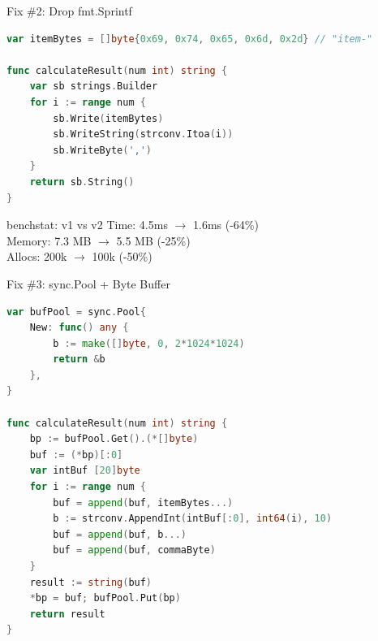\documentclass{beamer}
\begin{document}
\begin{frame}[fragile]{Fix \#2: Drop fmt.Sprintf}

  \begin{lstlisting}[language=Go]
var itemBytes = []byte{0x69, 0x74, 0x65, 0x6d, 0x2d} // "item-"

func calculateResult(num int) string {
    var sb strings.Builder
    for i := range num {
        sb.Write(itemBytes)
        sb.WriteString(strconv.Itoa(i))
        sb.WriteByte(',')
    }
    return sb.String()
}
  \end{lstlisting}

  \begin{block}{benchstat: v1 vs v2}
    Time: 4.5ms $\rightarrow$ 1.6ms (\alert{-64\%}) \\
    Memory: 7.3 MB $\rightarrow$ 5.5 MB (\alert{-25\%}) \\
    Allocs: 200k $\rightarrow$ 100k (\alert{-50\%})
  \end{block}

\end{frame}

\begin{frame}[fragile]{Fix \#3: sync.Pool + Byte Buffer}

  \begin{lstlisting}[language=Go]
var bufPool = sync.Pool{
    New: func() any {
        b := make([]byte, 0, 2*1024*1024)
        return &b
    },
}

func calculateResult(num int) string {
    bp := bufPool.Get().(*[]byte)
    buf := (*bp)[:0]
    var intBuf [20]byte
    for i := range num {
        buf = append(buf, itemBytes...)
        b := strconv.AppendInt(intBuf[:0], int64(i), 10)
        buf = append(buf, b...)
        buf = append(buf, commaByte)
    }
    result := string(buf)
    *bp = buf; bufPool.Put(bp)
    return result
}
  \end{lstlisting}

\end{frame}
\end{document}
